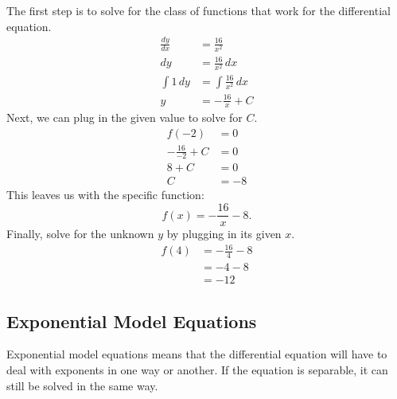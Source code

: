 \documentclass[12pt]{article}
\begin{document}
The first step is to solve for the class of functions that work for the differential equation.
\begin{align*}
    \frac{dy}{dx} & = \frac{16}{x^2}            \\[6pt]
    dy            & = \frac{16}{x^2} \, dx      \\[6pt]
    \int 1 \, dy  & = \int \frac{16}{x^2} \, dx \\[6pt]
    y             & = -\frac{16}{x} + C
\end{align*}
Next, we can plug in the given value to solve for $C$.
\begin{align*}
    f(-2)              & = 0  \\
    -\frac{16}{-2} + C & = 0  \\[6pt]
    8 + C              & = 0  \\
    C                  & = -8
\end{align*}
This leaves us with the specific function:
\[ f(x) = -\frac{16}{x} - 8. \]
Finally, solve for the unknown $y$ by plugging in its given $x$.
\begin{align*}
    f(4) & = -\frac{16}{4} - 8 \\[6pt]
         & = -4 - 8            \\
         & = -12
\end{align*}

\subsection{Exponential Model Equations}
Exponential model equations means that the differential equation will have to deal with exponents in one way or another. If the equation is separable, it can still be solved in the same way.
\end{document}

